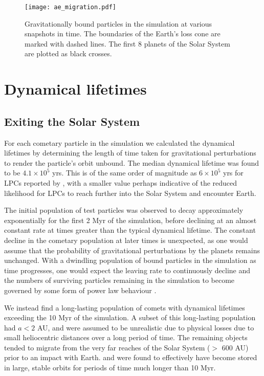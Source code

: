 
\begin{figure}[t!]
    \centering
    \texttt{[image: ae\_migration.pdf]}
    \caption[Particle migration from the Earth-Moon system]{Gravitationally bound particles in the simulation at various snapshots in time. The boundaries of the Earth's loss cone are marked with dashed lines. The first 8 planets of the Solar System are plotted as black crosses.}
    \label{fig:migration}
\end{figure}

\section{Dynamical lifetimes}

\subsection{Exiting the Solar System}
\label{sec:exiting}

For each cometary particle in the simulation we calculated the dynamical lifetimes by determining the length of time taken for gravitational perturbations to render the particle's orbit unbound. The median dynamical lifetime was found to be $4.1\times10^5$ yrs. This is of the same order of magnitude as $6\times10^5$ yrs for LPCs reported by \cite{1979IAUS...81..277W}, with a smaller value perhaps indicative of the reduced likelihood for LPCs to reach further into the Solar System and encounter Earth.

The initial population of test particles was observed to decay approximately exponentially for the first 2 Myr of the simulation, before declining at an almost constant rate at times greater than the typical dynamical lifetime. The constant decline in the cometary population at later times is unexpected, as one would assume that the probability of gravitational perturbations by the planets remains unchanged. With a dwindling population of bound particles in the simulation as time progresses, one would expect the leaving rate to continuously decline and the numbers of surviving particles remaining in the simulation to become governed by some form of power law behaviour \citep{1996ASPC..107..233D}. 

We instead find a long-lasting population of comets with dynamical lifetimes exceeding the 10 Myr of the simulation. A subset of this long-lasting population had $a < 2$ AU, and were assumed to be unrealistic due to physical losses due to small heliocentric distances over a long period of time. The remaining objects tended to migrate from the very far reaches of the Solar System ($>$ 600 AU) prior to an impact with Earth. and were found to effectively have become stored in large, stable orbits for periods of time much longer than 10 Myr. 

